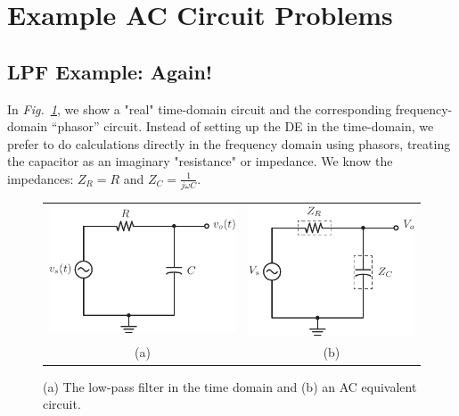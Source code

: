 \section{Example AC Circuit Problems}
\subsection{LPF Example: Again!}
In \emph{Fig.~\ref{fig:lpfagain}}, we show a "real"  time-domain circuit and the corresponding frequency-domain “phasor” circuit.   Instead of setting up the DE in the time-domain, we prefer to do calculations directly in the frequency domain using phasors, treating the capacitor as an imaginary "resistance" or impedance.  We know the impedances: ${Z_R} = R $ and $ {Z_C} = \frac{1}{{j\omega C}}$.
\begin{figure}[tb]
\centering
\begin{tabular}{cc}
\includegraphics[angle=-0.0,scale=1]{mod1_3_5_rc_lpf} &
\includegraphics[angle=-0.0,scale=1]{mod1_3_6_rc_lpf_Z}\\
(a) & (b)\\
\end{tabular}
\caption{(a) The low-pass filter in the time domain and (b) an AC equivalent circuit.}
\label{fig:lpfagain}
\end{figure}
